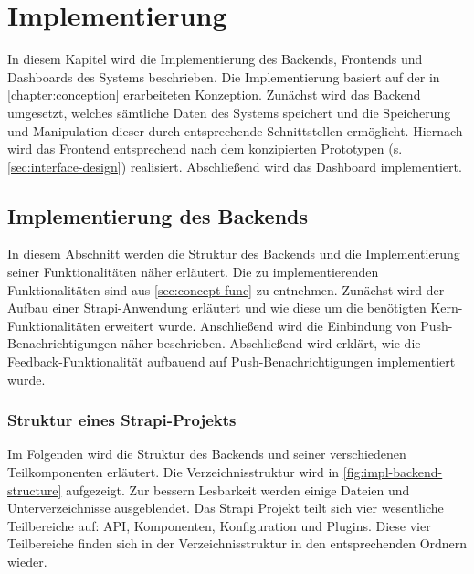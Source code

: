 \chapter{Implementierung}

In diesem Kapitel wird die Implementierung des Backends, Frontends und
Dashboards des Systems beschrieben. Die Implementierung basiert auf der in
\autoref{chapter:conception} erarbeiteten Konzeption.  Zunächst wird das Backend
umgesetzt, welches sämtliche Daten des Systems speichert und die Speicherung und
Manipulation dieser durch entsprechende Schnittstellen ermöglicht. Hiernach wird
das Frontend entsprechend nach dem konzipierten Prototypen (s.
\autoref{sec:interface-design}) realisiert. Abschließend wird das Dashboard
implementiert.



\section{Implementierung des Backends}

In diesem Abschnitt werden die Struktur des Backends und die Implementierung
seiner Funktionalitäten näher erläutert. Die zu implementierenden
Funktionalitäten sind aus \autoref{sec:concept-func} zu entnehmen. Zunächst wird
der Aufbau einer Strapi-Anwendung erläutert und wie diese um die benötigten
Kern-Funktionalitäten erweitert wurde. Anschließend wird die Einbindung von
Push-Benachrichtigungen näher beschrieben. Abschließend wird erklärt, wie die
Feedback-Funktionalität aufbauend auf Push-Benachrichtigungen implementiert
wurde.

\subsection{Struktur eines Strapi-Projekts} \label{ssec:impl-backend-structure}

Im Folgenden wird die Struktur des Backends und seiner verschiedenen
Teilkomponenten erläutert. Die Verzeichnisstruktur wird in
\autoref{fig:impl-backend-structure} aufgezeigt. Zur bessern Lesbarkeit werden
einige Dateien und Unterverzeichnisse ausgeblendet. Das Strapi Projekt teilt
sich vier wesentliche Teilbereiche auf: API, Komponenten, Konfiguration und
Plugins. Diese vier Teilbereiche finden sich in der Verzeichnisstruktur in den
entsprechenden Ordnern wieder.

